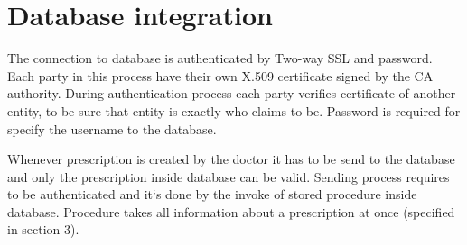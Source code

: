 \section{Database integration}
The connection to database is authenticated by Two-way SSL and password. Each party in this process have their own X.509 certificate signed by the CA authority. During authentication process each party verifies certificate of another entity, to be sure that entity is exactly who claims to be. Password is required for specify the username to the database.

Whenever prescription is created by the doctor it has to be send to the database and only the prescription inside database can be valid. Sending process requires to be authenticated and it`s done by the invoke of stored procedure inside database. Procedure takes all information about a prescription at once (specified in section 3).

